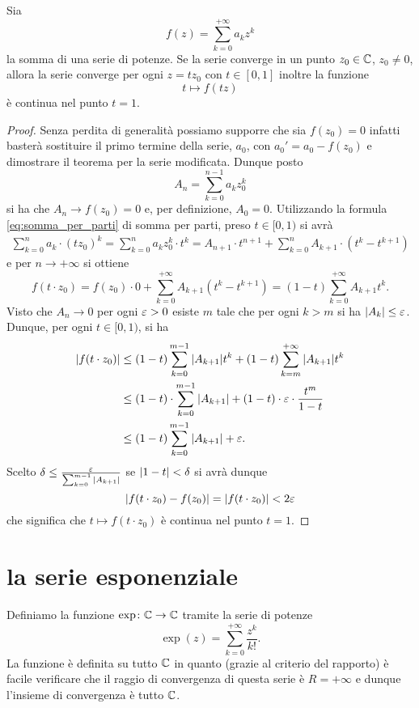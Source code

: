 \begin{theorem}
\mymark{*}%
\label{th:lemma_abel}%
%
%
Sia
\[
  f(z) = \sum_{k=0}^{+\infty} a_k z^k
\]
la somma di una serie di potenze. Se la serie converge in un punto $z_0\in {\mathbb C}$, $z_0\neq 0$, allora la serie converge per ogni $z=t z_0$ con $t\in [0,1]$ inoltre la funzione
\[
  t \mapsto f(tz)
\]
è continua nel punto $t=1$.
\end{theorem}
%
\begin{proof}
Senza perdita di generalità possiamo supporre che sia $f(z_0)=0$ infatti basterà sostituire il primo termine della serie, $a_0$, con $a_0' = a_0 - f(z_0)$ e dimostrare il teorema per la serie modificata.
Dunque posto
\[
  A_n = \sum_{k=0}^{n-1} a_k z_0^k
\]
si ha che $A_n \to f(z_0) = 0$ e, per definizione, $A_0 = 0$.
Utilizzando la formula \eqref{eq:somma_per_parti} di somma per parti, preso $t\in [0,1)$
si avrà
\begin{align*}
\sum_{k=0}^n a_k \cdot (tz_0)^k
= \sum_{k=0}^n a_k z_0^k \cdot t^k
= A_{n+1} \cdot t^{n+1} + \sum_{k=0}^n A_{k+1}\cdot (t^k - t^{k+1})
\end{align*}
e per $n\to +\infty$ si ottiene
\[
  f(t\cdot z_0) = f(z_0)\cdot 0 + \sum_{k=0}^{+\infty}A_{k+1}(t^k-t^{k+1})
  = (1-t)\sum_{k=0}^{+\infty} A_{k+1} t^k.
\]
Visto che $A_n \to 0$ per ogni $\varepsilon>0$ esiste $m$ tale che per ogni $k > m$ si ha ${\left|A_k\right|} \le  \varepsilon$. Dunque, per ogni $t\in [0,1)$, si ha
\begin{align*}
{\left|f(t\cdot z_0)\right|}
 &\le (1-t)\sum_{k=0}^{m-1} {\left|A_{k+1}\right|} t^k
  + (1-t)\sum_{k=m}^{+\infty} {\left|A_{k+1}\right|} t^k \\
 &\le (1-t)\cdot \sum_{k=0}^{m-1}{\left|A_{k+1}\right|} + (1-t)\cdot \varepsilon \cdot \frac{t^{m}}{1-t} \\
 &\le (1-t)\sum_{k=0}^{m-1}{\left|A_{k+1}\right|} + \varepsilon.
\end{align*}
Scelto $\delta \le \frac{\varepsilon} {\sum_{k=0}^{m-1} {\left|A_{k+1}\right|}}$ se ${\left|1-t\right|}<\delta$ si avrà
dunque
\[
  {\left|f(t\cdot z_0)-f(z_0)\right|} = {\left|f(t\cdot z_0)\right|} < 2\varepsilon
\]
che significa che $t\mapsto f(t\cdot z_0)$ è continua nel punto $t=1$.
\end{proof}


\section{la serie esponenziale}

Definiamo la funzione $\exp \colon {\mathbb C} \to {\mathbb C}$
tramite la serie di potenze
\begin{equation}\label{eq:def_exp}
\exp(z) = \sum_{k=0}^{+\infty} \frac{z^k}{k!}.
\end{equation}
La funzione è definita su tutto ${\mathbb C}$ in quanto (grazie al criterio del rapporto)
è facile verificare che il raggio di convergenza di questa serie è $R=+\infty$
e dunque l'insieme di convergenza è tutto ${\mathbb C}$.

